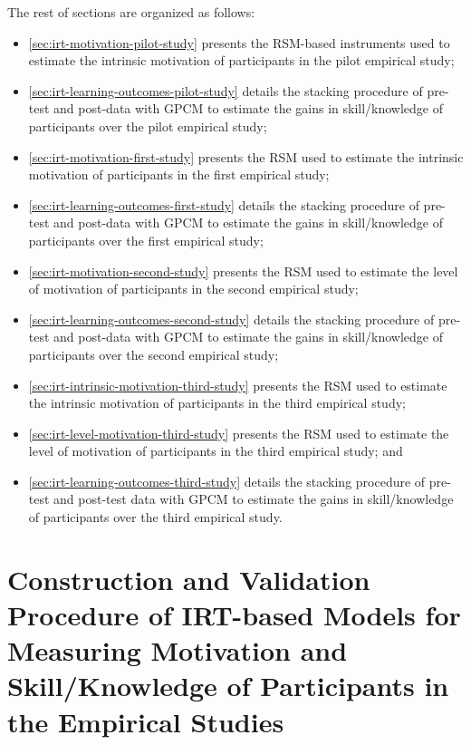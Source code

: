 The rest of sections are organized as follows:
\begin{itemize}
\item
\autoref{sec:irt-motivation-pilot-study} presents the RSM-based instruments used to estimate the intrinsic motivation of participants in the pilot empirical study;
\item
\autoref{sec:irt-learning-outcomes-pilot-study} details the stacking procedure of pre-test and post-data with GPCM to estimate the gains in skill/knowledge of participants over the pilot empirical study;
\item
\autoref{sec:irt-motivation-first-study} presents the RSM used to estimate the intrinsic motivation of participants in the first empirical study;
\item
\autoref{sec:irt-learning-outcomes-first-study} details the stacking procedure of pre-test and post-data with GPCM to estimate the gains in skill/knowledge of participants over the first empirical study;
\item
\autoref{sec:irt-motivation-second-study} presents the RSM used to estimate the level of motivation of participants in the second empirical study;
\item
\autoref{sec:irt-learning-outcomes-second-study} details the stacking procedure of pre-test and post-data with GPCM to estimate the gains in skill/knowledge of participants over the second empirical study; 
\item
\autoref{sec:irt-intrinsic-motivation-third-study} presents the RSM used to estimate the intrinsic motivation of participants in the third empirical study; 
\item
\autoref{sec:irt-level-motivation-third-study} presents the RSM used to estimate the level of motivation of participants in the third empirical study; and
\item
\autoref{sec:irt-learning-outcomes-third-study} details the stacking procedure of pre-test and post-test data with GPCM to estimate the gains in skill/knowledge of participants over the third empirical study.
\end{itemize}


\section[Construction and Validation Procedure of IRT-based Models]{Construction and Validation Procedure of IRT-based Models for Measuring Motivation and Skill/Knowledge of Participants in the Empirical Studies}
\label{sec:irt-motivation}

